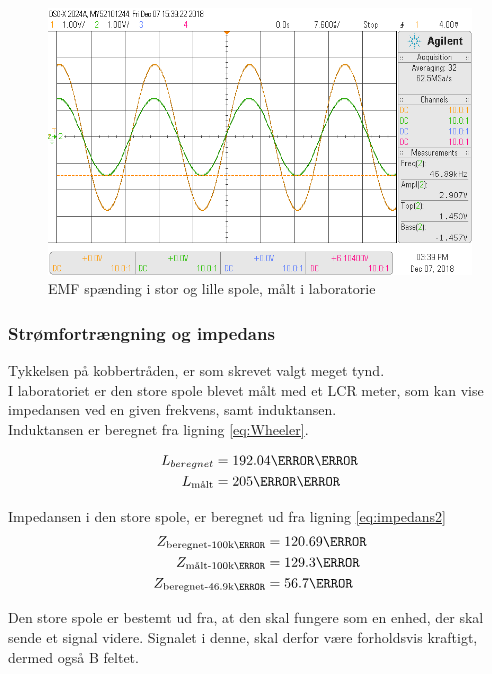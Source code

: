\begin{figure}[h!]
	\centering
	\includegraphics[width=1\textwidth]{billeder/vin_vout_png.png}
	\caption{EMF spænding i stor og lille spole, målt i laboratorie}
	\label{fig:EMF_spole_lab}
\end{figure}
\newpage
\subsubsection{Strømfortrængning og impedans}
Tykkelsen på kobbertråden, er som skrevet valgt meget tynd.\\
I laboratoriet er den store spole blevet målt med et LCR meter, som kan vise impedansen ved en given frekvens, samt induktansen. \\
Induktansen er beregnet fra ligning \ref{eq:Wheeler}.

\begin{align}
	 L_{beregnet} &= 192.04\micro\henry\\
     L_{\text{målt}} &= 205\micro\henry
\end{align}

Impedansen i den store spole, er beregnet ud fra ligning \ref{eq:impedans2}
\begin{align}
	 Z_{\text{beregnet-100k\hertz}}&=120.69\ohm\\
	 Z_{\text{målt-100k\hertz}}&=129.3\ohm\\
	 Z_{\text{beregnet-46.9k\hertz}}&= 56.7\ohm               
\end{align}






Den store spole er bestemt ud fra, at den skal fungere som en enhed, der skal sende et signal videre. 
Signalet i denne, skal derfor være forholdsvis kraftigt, dermed også B feltet.


